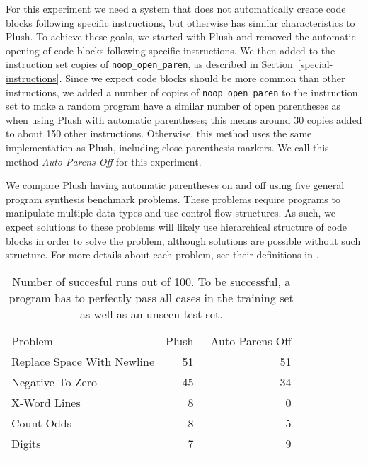 For this experiment we need a system that does not automatically create code blocks following specific instructions, but otherwise has similar characteristics to Plush. To achieve these goals, we started with Plush and removed the automatic opening of code blocks following specific instructions. We then added to the instruction set copies of \texttt{noop\_open\_paren}, as described in Section~\ref{special-instructions}. Since we expect code blocks should be more common than other instructions, we added a number of copies of \texttt{noop\_open\_paren} to the instruction set to make a random program have a similar number of open parentheses as when using Plush with automatic parentheses; this means around 30 copies added to about 150 other instructions. Otherwise, this method uses the same implementation as Plush, including close parenthesis markers. We call this method \textit{Auto-Parens Off} for this experiment.

We compare Plush having automatic parentheses on and off using five general program synthesis benchmark problems. These problems require programs to manipulate multiple data types and use control flow structures. As such, we expect solutions to these problems will likely use hierarchical structure of code blocks in order to solve the problem, although solutions are possible without such structure. For more details about each problem, see their definitions in \cite{Helmuth:2015:GECCO}.

\begin{table}
\centering
\caption{
Number of succesful runs out of 100. To be successful, a program has to perfectly pass all cases in the training set as well as an unseen test set.
}
\label{no-auto-parens-experiment}       %
%
%
\begin{tabular}{l r r}
\hline\noalign{\smallskip}
Problem                    & Plush & ~Auto-Parens Off \\
\noalign{\smallskip}\svhline\noalign{\smallskip}
Replace Space With Newline &  51 & 51 \\
Negative To Zero           &  45 & 34 \\
X-Word Lines               &   8 &  0 \\
Count Odds                 &   8 &  5 \\
Digits                     &   7 &  9 \\
\noalign{\smallskip}\hline\noalign{\smallskip}
\end{tabular}
\end{table}


